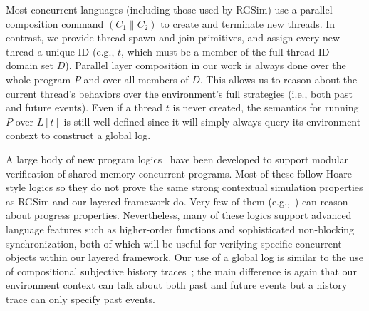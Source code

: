
Most concurrent languages (including those used by RGSim) use a
parallel composition command $(C_1 \| C_2)$ to create and terminate
new threads.  In contrast, we provide thread spawn and join
primitives, and assign every new thread a unique ID (e.g., $t$, which
must be a member of the full thread-ID domain set $D$). Parallel layer
composition in our work is always done over the whole program $P$ and over
all members of $D$. This allows us to reason about the current
thread's behaviors over the environment's full strategies (i.e., both
past and future events). Even if a thread $t$ is never
created, the semantics for running $P$ over $L[t]$ is still well
defined since it will simply always query its environment context to
construct a global log.

A large body of new program
logics~\cite{ohearn:concur04,brookes:concur04,feng07:sagl,vafeiadis:marriage,LRG,verifast,gotsman13,Turon13popl,Turon13icfp,nanevski13,nanevski14,sergey15,sergey15pldi,pinto14,iris15,civl15,pinto16,xu16}
have been developed to support modular verification of shared-memory
concurrent programs. Most of these follow Hoare-style logics so they
do not prove the same strong contextual simulation properties as RGSim
and our layered framework do. Very few of them (e.g.,~\cite{pinto16})
can reason about progress properties. Nevertheless, many of these
logics support advanced language features such as higher-order functions
and sophisticated non-blocking synchronization, both of which will be
useful for verifying specific concurrent objects within our layered
framework. Our use of a global log is similar to the use of compositional
subjective history traces~\cite{sergey15}; the main difference is
again that our environment context can talk about both past and future
events but a history trace can only specify past events.

